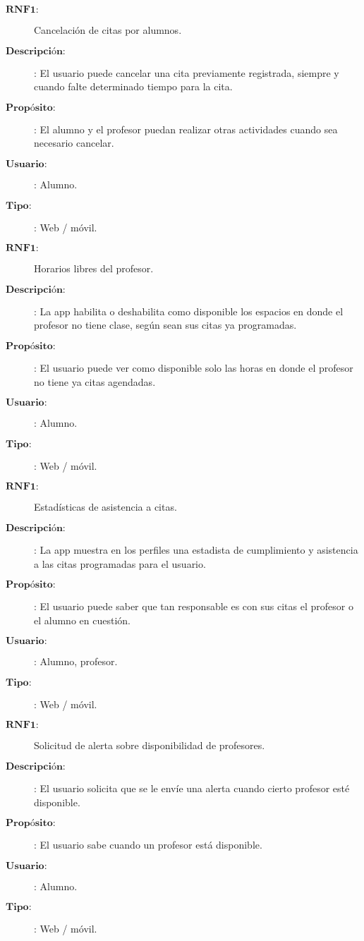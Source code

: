 \begin{description}
\item[$\textbf{RNF1:}$] Cancelación de citas por alumnos. 
\item[$\textbf{Descripción:}$]: El usuario puede cancelar una cita previamente registrada, siempre y cuando falte determinado tiempo para la cita.
\item[$\textbf{Propósito:}$]: El alumno y el profesor puedan realizar otras actividades cuando sea necesario cancelar. 
\item[$\textbf{Usuario:}$]: Alumno.
\item[$\textbf{Tipo:}$]: Web / móvil. \\

\item[$\textbf{RNF1:}$] Horarios libres del profesor.  
\item[$\textbf{Descripción:}$]: La app habilita o deshabilita como disponible los espacios en donde el profesor no tiene clase, según sean sus citas ya programadas.
\item[$\textbf{Propósito:}$]: El usuario puede ver como disponible solo las horas en donde el profesor no tiene ya citas agendadas. 
\item[$\textbf{Usuario:}$]: Alumno.
\item[$\textbf{Tipo:}$]: Web / móvil. \\

\item[$\textbf{RNF1:}$] Estadísticas de asistencia a citas.  
\item[$\textbf{Descripción:}$]: La app muestra en los perfiles una estadista de cumplimiento y asistencia a las citas programadas para el usuario.
\item[$\textbf{Propósito:}$]: El usuario puede saber que tan responsable es con sus citas el profesor o el alumno en cuestión.
\item[$\textbf{Usuario:}$]: Alumno, profesor.
\item[$\textbf{Tipo:}$]: Web / móvil. \\

\item[$\textbf{RNF1:}$] Solicitud de alerta sobre disponibilidad de profesores.  
\item[$\textbf{Descripción:}$]: El usuario solicita que se le envíe una alerta cuando cierto profesor esté disponible.
\item[$\textbf{Propósito:}$]: El usuario sabe cuando un profesor está disponible.
\item[$\textbf{Usuario:}$]: Alumno.
\item[$\textbf{Tipo:}$]: Web / móvil. \\


\end{description}
